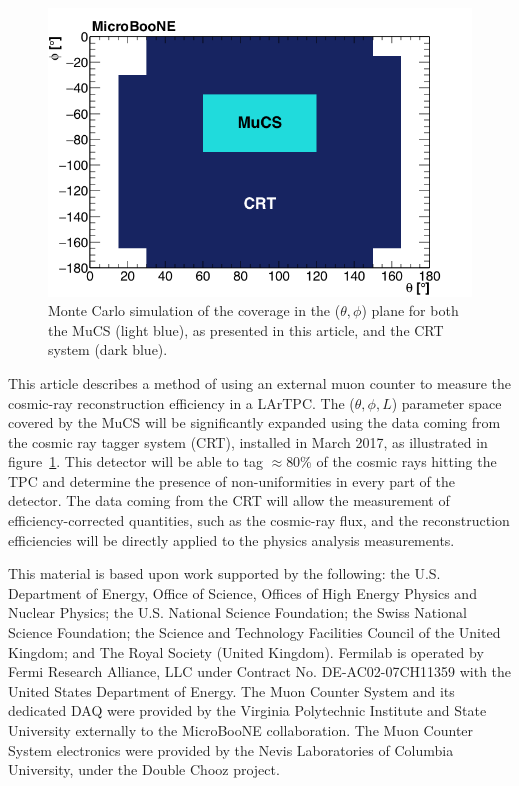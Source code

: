 \documentclass[a4paper,11pt]{article}
\begin{document}
\begin{figure}[htbp]
  \begin{center}
    \includegraphics[width=0.7\linewidth]{figures/crt.png}
    \caption{Monte Carlo simulation of the coverage in the ($\theta,\phi$) plane for both the MuCS (light blue), as presented in this article, and the CRT system (dark blue).} \label{fig:crt}
  \end{center}
\end{figure}

This article describes a method of using an external muon counter to measure the cosmic-ray reconstruction efficiency in a LArTPC. The ($\theta, \phi, L$) parameter space covered by the MuCS will be significantly expanded using the data coming from the cosmic ray tagger system (CRT), installed in March 2017, as illustrated in figure~\ref{fig:crt}. This detector will be able to tag $\approx$80\% of the cosmic rays hitting the TPC and determine the presence of non-uniformities in every part of the detector. The data coming from the CRT will allow the measurement of efficiency-corrected quantities, such as the cosmic-ray flux, and the reconstruction efficiencies will be directly applied to the physics analysis measurements.



\clearpage{}

\acknowledgments

This material is based upon work supported by the following: the U.S. Department of Energy, Office of Science, Offices of High Energy Physics and Nuclear Physics; the U.S. National Science Foundation; the Swiss National Science Foundation; the Science and Technology Facilities Council of the United Kingdom; and The Royal Society (United Kingdom). Fermilab is operated by Fermi Research Alliance, LLC under Contract No. DE-AC02-07CH11359 with the United States Department of Energy. The Muon Counter System and its dedicated DAQ were provided by the Virginia Polytechnic Institute and State University externally to the MicroBooNE collaboration. The Muon Counter System electronics were provided by the Nevis Laboratories of Columbia University, under the Double Chooz project.
\end{document}
